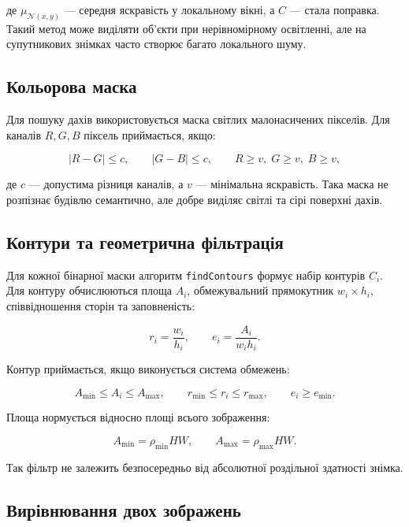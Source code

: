 \documentclass[12pt,a4paper]{article}
\begin{document}
де \(\mu_{\mathcal{N}(x,y)}\) --- середня яскравість у локальному вікні, а \(C\) --- стала поправка. Такий метод може виділяти об'єкти при нерівномірному освітленні, але на супутникових знімках часто створює багато локального шуму.

\subsection{Кольорова маска}

Для пошуку дахів використовується маска світлих малонасичених пікселів. Для каналів \(R,G,B\) піксель приймається, якщо:

\begin{equation}
  |R-G|\leq c, \qquad |G-B|\leq c,
  \qquad R\geq v,\;G\geq v,\;B\geq v,
\end{equation}

де \(c\) --- допустима різниця каналів, а \(v\) --- мінімальна яскравість. Така маска не розпізнає будівлю семантично, але добре виділяє світлі та сірі поверхні дахів.

\subsection{Контури та геометрична фільтрація}

Для кожної бінарної маски алгоритм \texttt{findContours} формує набір контурів \(C_i\). Для контуру обчислюються площа \(A_i\), обмежувальний прямокутник \(w_i\times h_i\), співвідношення сторін та заповненість:

\begin{equation}
  r_i=\frac{w_i}{h_i}, \qquad
  e_i=\frac{A_i}{w_i h_i}.
\end{equation}

Контур приймається, якщо виконується система обмежень:

\begin{equation}
  A_{\min}\leq A_i\leq A_{\max},\qquad
  r_{\min}\leq r_i\leq r_{\max},\qquad
  e_i\geq e_{\min}.
\end{equation}

Площа нормується відносно площі всього зображення:

\begin{equation}
  A_{\min}=\rho_{\min}HW, \qquad
  A_{\max}=\rho_{\max}HW.
\end{equation}

Так фільтр не залежить безпосередньо від абсолютної роздільної здатності знімка.

\subsection{Вирівнювання двох зображень}
\end{document}
